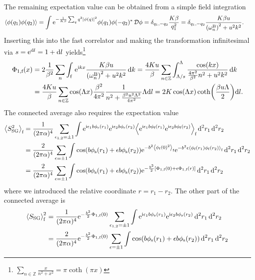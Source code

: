 \documentclass[english, parskip=full]{scrartcl}
\begin{document}
The remaining expectation value can be obtained from a simple field integration
\begin{align}
\bra*{\phi(q_1)\phi(q_2)} &= \int \powe{-\frac{1}{K\beta} \sum_q q^2 \abs*{\phi(q)}^2} \phi(q_1)\phi(-q_2)^\ast\,\mathcal{D}\phi = \delta_{q_1,-q_2} \frac{K\beta}{q_1^2} = \delta_{q_1,-q_2} \frac{K\beta u}{\kla*{\omega_n^\B}^2 + u^2k^2}.
\end{align}
Inserting this into the fast correlator and making the transformation infinitesimal via $s=\powe{\d l} = 1 + \d l$ yields\footnote{$\sum_{n\in\mathbb{Z}} \frac{x}{n^2+x^2} = \pi \coth(\pi x)$}
\begin{align}
\Phi_{1,\f}(x) &= 2\frac{1}{\beta^2} \sum_{n} \intx{\f}{ }{ \powe{\i kx} \frac{K\beta u}{\kla*{\omega_n^\B}^2 + u^2k^2}}{k} = \frac{4Ku}{\beta} \sum_{n\in\mathbb{Z}} \intx{\Lambda/s}{\Lambda}{\frac{\cos(kx)}{\frac{4\pi^2}{\beta^2}n^2 + u^2k^2}}{k}\\
&= \frac{4Ku}{\beta} \sum_{n\in\mathbb{Z}} \cos(\Lambda x) \frac{\beta^2}{4\pi^2} \frac{1}{n^2 + \frac{\beta^2 u^2\Lambda^2}{4\pi^2}} \Lambda\d l = 2K \cos(\Lambda x) \coth\kla*{\frac{\beta u\Lambda}{2}} \d l.
\end{align}
The connected average also requires the expectation value
\begin{align}
\bra*{S_\text{SG}^2}_\f &= \frac{1}{(2\pi\alpha)^4} \sum_{\epsilon_{1,2}=\pm 1} \int \powe{\i\epsilon_1  b\phi_\s(r_1)} \powe{\i \epsilon_2 b\phi_\s(r_2)} \bra*{\powe{\i \epsilon_1 b\phi_\f(r_1)} \powe{\i \epsilon_2 b\phi_\f(r_2)}}_\f \,\d^2r_1 \,\d^2r_2\\
&= \frac{2}{(2\pi\alpha)^4} \sum_{\epsilon=\pm 1} \int \cos\kla*{b\phi_\s(r_1) + \epsilon b\phi_\s(r_2)} \powe{-b^2\bra*{\phi_\f(0)^2}_\f} \powe{-b^2 \epsilon \bra*{\phi_\f(r_1) \phi_\f(r_2)}_\f} \,\d^2r_1\,\d^2r_2\\
&= \frac{2}{(2\pi\alpha)^4} \sum_{\epsilon=\pm 1} \int \cos\kla*{b\phi_\s(r_1) + \epsilon b\phi_\s(r_2)} \powe{-\frac{b^2}{2} \klb*{\Phi_{1,\f}(0) + \epsilon \Phi_{1,\f}(r)} } \,\d^2r_1\,\d^2r_2
\end{align}
where we introduced the relative coordinate $r=r_1-r_2$.
The other part of the connected average is
\begin{align}
\bra*{S_\text{SG}}_\f^2 &= \frac{1}{(2\pi\alpha)^4} \powe{-\frac{b^2}{2} \Phi_{1,\f}(0)} \sum_{\epsilon_{1,2} =\pm 1} \int \powe{\i\epsilon_1 b\phi_\s(r_1)}\powe{\i\epsilon_2 b\phi_\s(r_2)}\,\d^2r_1 \,\d^2r_2\\
&= \frac{2}{(2\pi\alpha)^4} \powe{-\frac{b^2}{2} \Phi_{1,\f}(0)} \sum_{\epsilon =\pm 1} \int \cos\kla*{b\phi_\s(r_1) + \epsilon b\phi_\s(r_2)} \,\d^2r_1 \,\d^2r_2
\end{align}
\end{document}
